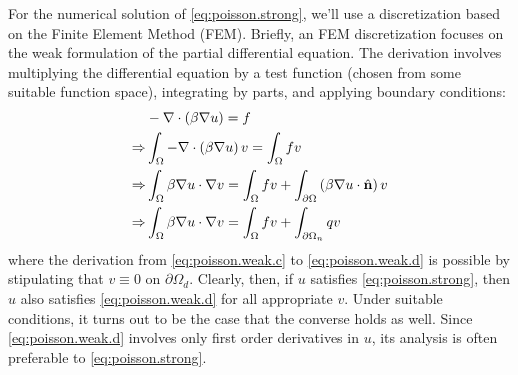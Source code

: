 For the numerical solution of \eqref{eq:poisson.strong}, we'll use a discretization based on the Finite Element Method (FEM). Briefly, an FEM discretization focuses on the weak formulation of the partial differential equation. The derivation involves multiplying the differential equation by a test function (chosen from some suitable function space), integrating by parts, and applying boundary conditions:
\begin{subequations}
\begin{align}
& -\nabla \cdot \left( \beta \nabla u \right) = f \\
\Rightarrow & \int_{\Omega} -\nabla \cdot \left( \beta \nabla u \right) v = \int_{\Omega} f v \\
\Rightarrow & \int_{\Omega} \beta \nabla u \cdot \nabla v =
    \int_{\Omega} f v + \int_{\partial \Omega} \left( \beta \nabla u \cdot \hat{\mathbf{n}} \right) v \label{eq:poisson.weak.c} \\
\Rightarrow & \int_{\Omega} \beta \nabla u \cdot \nabla v = \int_{\Omega} f v + \int_{\partial \Omega_n} q v \label{eq:poisson.weak.d}
\end{align}
\end{subequations}
where the derivation from \eqref{eq:poisson.weak.c} to \eqref{eq:poisson.weak.d} is possible by stipulating that $v \equiv 0$ on $\partial \Omega_d$. Clearly, then, if $u$ satisfies \eqref{eq:poisson.strong}, then $u$ also satisfies \eqref{eq:poisson.weak.d} for all appropriate $v$. Under suitable conditions, it turns out to be the case that the converse holds as well. Since \eqref{eq:poisson.weak.d} involves only first order derivatives in $u$, its analysis is often preferable to \eqref{eq:poisson.strong}.

